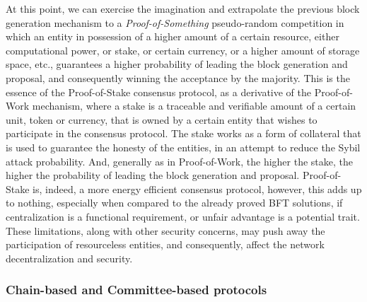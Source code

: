 \documentclass[journal]{IEEEtran}
\begin{document}
At this point, we can exercise the imagination and extrapolate the
previous block generation mechanism to a \emph{Proof-of-Something} 
pseudo-random competition in which an entity in possession of a higher
amount of a certain resource, either computational power, or stake, 
or certain currency, or a higher amount of storage space, etc., guarantees
a higher probability of leading the block generation and proposal, and
consequently winning the acceptance by the majority. This is the essence of
the Proof-of-Stake consensus protocol, as a derivative of the Proof-of-Work
mechanism, where a stake is a traceable and verifiable amount of a certain
unit, token or currency, that is owned by a certain entity that wishes to
participate in the consensus protocol. The stake works as a form of collateral
that is used to guarantee the honesty of the entities, in an attempt to
reduce the Sybil attack probability. And, generally as in Proof-of-Work, 
the higher the stake, the higher the probability of leading the block generation 
and proposal. Proof-of-Stake is, indeed, a more energy efficient consensus protocol,
however, this adds up to nothing, especially when compared to the already proved
BFT solutions, if centralization is a functional requirement, 
or unfair advantage is a potential trait. 
These limitations, along with other security concerns, may push away the 
participation of resourceless entities, and consequently, affect the network
decentralization and security.

\subsubsection{Chain-based and Committee-based protocols}
\end{document}
